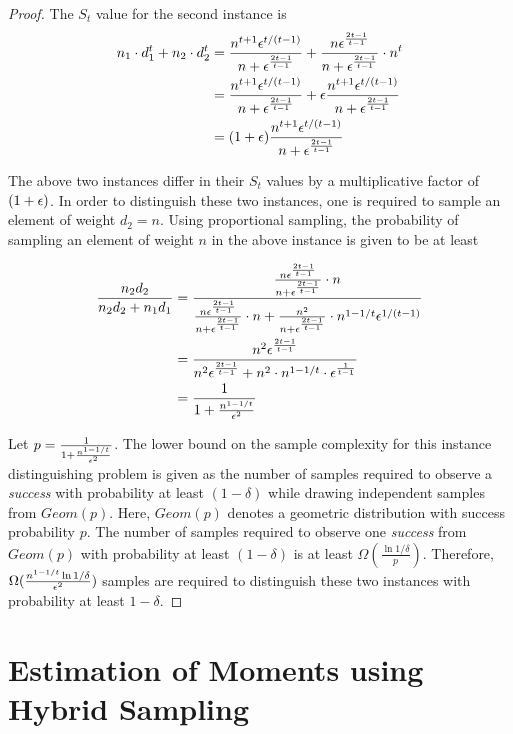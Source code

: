 \begin{proof}
\noindent The $S_t$ value for the second instance is 
\begin{align*}
n_1\cdot d_1^t + n_2 \cdot d_2^t 
& = \frac{n^{t+1} \epsilon^{t/(t-1)}}{n + \epsilon^{\frac{2t-1}{t-1}}} +  \frac{n \epsilon^{\frac{2t-1}{t-1}}}{n + \epsilon^{\frac{2t-1}{t-1}}} \cdot n^t\\
& = \frac{n^{t+1} \epsilon^{t/(t-1)}}{n + \epsilon^{\frac{2t-1}{t-1}}} + \epsilon \frac{n^{t+1} \epsilon^{t/(t-1)}}{n + \epsilon^{\frac{2t-1}{t-1}}}\\
& = (1+\epsilon) \frac{n^{t+1} \epsilon^{t/(t-1)}}{n +\epsilon^{\frac{2t-1}{t-1}}}
\end{align*}

The above two instances differ in their $S_t$ values by a multiplicative factor of $(1+\epsilon)$. In order to distinguish these two instances, one is required to sample an element of weight $d_2=n$. Using proportional sampling, the probability of sampling an element of weight $n$ in the above instance is given to be at least


\begin{align*}
\frac{n_2 d_2}{n_2 d_2 + n_1 d_1}
& = \frac{\frac{n \epsilon^{\frac{2t-1}{t-1}}}{n + \epsilon^{\frac{2t-1}{t-1}}} \cdot n} {\frac{n \epsilon^{\frac{2t-1}{t-1}}}{n + \epsilon^{\frac{2t-1}{t-1}}} \cdot n + \frac{n^2 }{n + \epsilon^{\frac{2t-1}{t-1}}} \cdot n^{1-1/t} \epsilon^{1/(t-1)}}\\
& =  \frac{n^2 \epsilon^{\frac{2t-1}{t-1}}}{n^2 \epsilon^{\frac{2t-1}{t-1}} + n^2 \cdot n^{1-1/t} \cdot \epsilon^{\frac{1}{t-1}}}\\
& =  \frac{1}{1+\frac{n^{1-1/t}}{\epsilon^2}}
\end{align*}

Let $p=\frac{1}{1+\frac{n^{1-1/t}}{\epsilon^2}}$. The lower bound on the sample complexity for this instance distinguishing problem is given as the number of samples required to observe a \textit{success} with probability at least $(1-\delta)$ while drawing independent samples from $Geom(p)$. Here, $Geom(p)$ denotes a geometric distribution with success probability $p$. The number of samples required to observe one \textit{success} from $Geom(p)$ with probability at least $(1-\delta)$ is at least $\Omega(\frac{\ln 1/\delta}{p})$. Therefore, $\Omega(\frac{n^{1-1/t}\ln1/\delta}{\epsilon^2})$ samples are required to distinguish these two instances with probability at least $1-\delta$.

\end{proof}

\section{Estimation of Moments using Hybrid Sampling}\label{sec:lower-hybrid}

